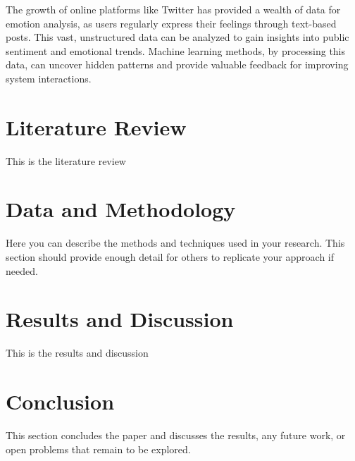 The growth of online platforms like Twitter has provided a wealth of data for emotion analysis, as users regularly express their feelings through text-based posts. This vast, unstructured data can be analyzed to gain insights into public sentiment and emotional trends. Machine learning methods, by processing this data, can uncover hidden patterns and provide valuable feedback for improving system interactions. 

\section{Literature Review}
This is the literature review

\section{Data and Methodology}
Here you can describe the methods and techniques used in your research. This section should provide enough detail for others to replicate your approach if needed.

\section{Results and Discussion}
This is the results and discussion

\section{Conclusion}
This section concludes the paper and discusses the results, any future work, or open problems that remain to be explored.
